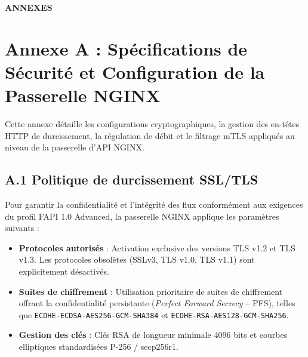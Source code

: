 \clearpage
\begin{center}
\Huge\bfseries ANNEXES
\end{center}
\vspace{0.8cm}

\section*{Annexe A : Spécifications de Sécurité et Configuration de la Passerelle NGINX}
Cette annexe détaille les configurations cryptographiques, la gestion des en-têtes HTTP de durcissement, la régulation de débit et le filtrage mTLS appliqués au niveau de la passerelle d'API NGINX.

\subsection*{A.1 Politique de durcissement SSL/TLS}
Pour garantir la confidentialité et l'intégrité des flux conformément aux exigences du profil FAPI 1.0 Advanced, la passerelle NGINX applique les paramètres suivants :
\begin{itemize}[leftmargin=*]
    \item \textbf{Protocoles autorisés} : Activation exclusive des versions TLS v1.2 et TLS v1.3. Les protocoles obsolètes (SSLv3, TLS v1.0, TLS v1.1) sont explicitement désactivés.
    \item \textbf{Suites de chiffrement} : Utilisation prioritaire de suites de chiffrement offrant la confidentialité persistante (\textit{Perfect Forward Secrecy} -- PFS), telles que \texttt{ECDHE-ECDSA-AES256-GCM-SHA384} et \texttt{ECDHE-RSA-AES128-GCM-SHA256}.
    \item \textbf{Gestion des clés} : Clés RSA de longueur minimale 4096 bits et courbes elliptiques standardisées P-256 / secp256r1.
\end{itemize}

